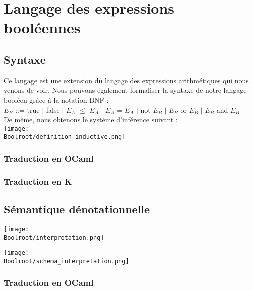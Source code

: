 \chapter{Langage des expressions booléennes}

\section{Syntaxe}

Ce langage est une extension du langage des expressions arithmétiques qui nous venons de voir.
Nous pouvons également formaliser la syntaxe de notre langage booléen grâce à la notation BNF : \\
$E_B$ ::= true $|$ false $|$ $E_A$ $\le$ $E_A$ $|$ $E_A$ = $E_A$ $|$ not $E_B$ $|$ $E_B$ or $E_B$ $|$ $E_B$ and $E_B$
\vspace{1\baselineskip} \\
De même, nous obtenons le système d'inférence suivant : \\
\texttt{[image: \\Boolroot/definition\_inductive.png]}

	\subsection{Traduction en OCaml}
	

	\subsection{Traduction en K}
	

\section{Sémantique dénotationnelle}





\texttt{[image: \\Boolroot/interpretation.png]}

\texttt{[image: \\Boolroot/schema\_interpretation.png]}

	\subsection{Traduction en OCaml}
	
	
